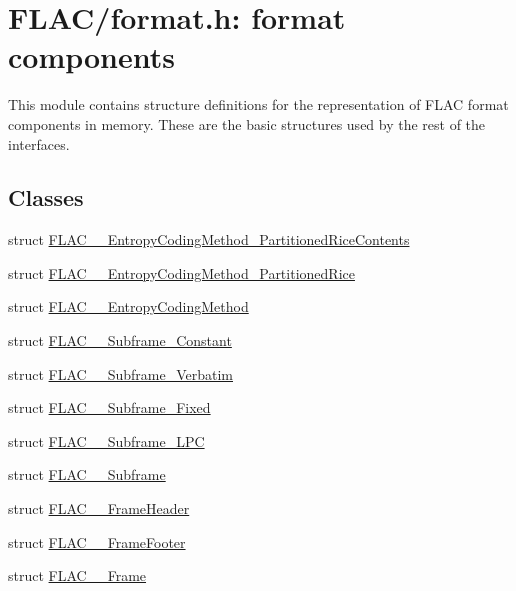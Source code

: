 \hypertarget{group__flac__format}{}\section{F\+L\+A\+C/format.h\+: format components}
\label{group__flac__format}


This module contains structure definitions for the representation of F\+L\+AC format components in memory. These are the basic structures used by the rest of the interfaces.  


\subsection*{Classes}
\begin{DoxyCompactItemize}
\item 
struct \mbox{\hyperlink{struct_f_l_a_c_____entropy_coding_method___partitioned_rice_contents}{F\+L\+A\+C\+\_\+\+\_\+\+Entropy\+Coding\+Method\+\_\+\+Partitioned\+Rice\+Contents}}
\item 
struct \mbox{\hyperlink{struct_f_l_a_c_____entropy_coding_method___partitioned_rice}{F\+L\+A\+C\+\_\+\+\_\+\+Entropy\+Coding\+Method\+\_\+\+Partitioned\+Rice}}
\item 
struct \mbox{\hyperlink{struct_f_l_a_c_____entropy_coding_method}{F\+L\+A\+C\+\_\+\+\_\+\+Entropy\+Coding\+Method}}
\item 
struct \mbox{\hyperlink{struct_f_l_a_c_____subframe___constant}{F\+L\+A\+C\+\_\+\+\_\+\+Subframe\+\_\+\+Constant}}
\item 
struct \mbox{\hyperlink{struct_f_l_a_c_____subframe___verbatim}{F\+L\+A\+C\+\_\+\+\_\+\+Subframe\+\_\+\+Verbatim}}
\item 
struct \mbox{\hyperlink{struct_f_l_a_c_____subframe___fixed}{F\+L\+A\+C\+\_\+\+\_\+\+Subframe\+\_\+\+Fixed}}
\item 
struct \mbox{\hyperlink{struct_f_l_a_c_____subframe___l_p_c}{F\+L\+A\+C\+\_\+\+\_\+\+Subframe\+\_\+\+L\+PC}}
\item 
struct \mbox{\hyperlink{struct_f_l_a_c_____subframe}{F\+L\+A\+C\+\_\+\+\_\+\+Subframe}}
\item 
struct \mbox{\hyperlink{struct_f_l_a_c_____frame_header}{F\+L\+A\+C\+\_\+\+\_\+\+Frame\+Header}}
\item 
struct \mbox{\hyperlink{struct_f_l_a_c_____frame_footer}{F\+L\+A\+C\+\_\+\+\_\+\+Frame\+Footer}}
\item 
struct \mbox{\hyperlink{struct_f_l_a_c_____frame}{F\+L\+A\+C\+\_\+\+\_\+\+Frame}}

\end{DoxyCompactItemize}
